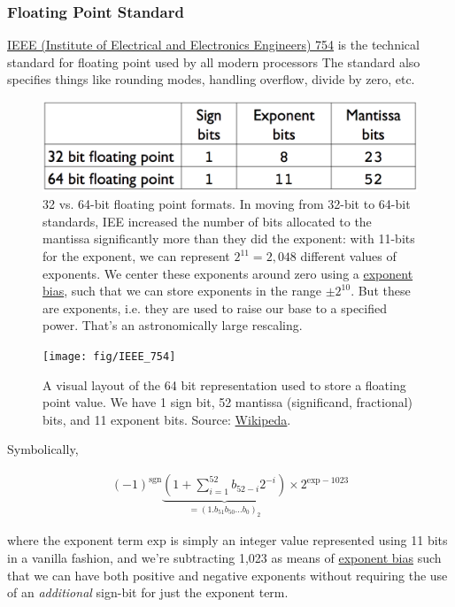\documentclass[12pt,letterpaper,twoside]{article}
\begin{document}
\subsubsection{Floating Point Standard}
\href{https://en.wikipedia.org/wiki/IEEE_754}
{IEEE (Institute of Electrical and Electronics Engineers) 754} is the
technical standard for floating point used by all modern processors
The standard also specifies things like rounding modes, handling overflow,
divide by zero, etc. 

\begin{figure}[h]
\centering
\includegraphics[scale=0.4]{fig/float-table.png}
\caption{\footnotesize 32 vs. 64-bit floating point formats.
  In moving from 32-bit to 64-bit standards, IEE
  increased the number of bits allocated to the mantissa significantly
  more than they did the exponent: with 11-bits for the
  exponent, we can represent $2^{11} = 2,048$ different values of
  exponents. We center these exponents around zero using a
  \href{https://en.wikipedia.org/wiki/Exponent_bias}{exponent bias},
  such that we can store exponents in the range $\pm 2^{10}$. But
  these are exponents, i.e. they are used to raise our base to a
  specified power. That's an astronomically
  large rescaling.}
\end{figure}

\begin{figure}[h]
  \centering
  \texttt{[image: fig/IEEE\_754]}
  \caption{\footnotesize A visual layout of the 64 bit representation used to store
    a floating point value. We have 1 sign bit, 52 mantissa
(significand, fractional) bits, and 11 exponent bits. Source: \href{https://en.wikipedia.org/wiki/Double-precision_floating-point_format}{Wikipeda}.}
\end{figure}

Symbolically, 

\begin{align*}
  (-1)^{\textrm{sgn}} \underbrace{\left(1 + \sum_{i=1}^{52} b_{52-i} 2^{-i}
  \right)}_{= \left(1.b_{51} b_{50} \ldots b_0\right)_2} \times 2^{\textrm{exp} - 1023}
\end{align*}

where the exponent term $\textrm{exp}$ is simply an integer value
represented using 11 bits in a vanilla fashion, and we're subtracting
1,023 as means of
\href{https://en.wikipedia.org/wiki/Exponent_bias}{exponent bias} such
that we can have both positive and negative exponents without
requiring the use of an \emph{additional} sign-bit for just the
exponent term.
\end{document}
